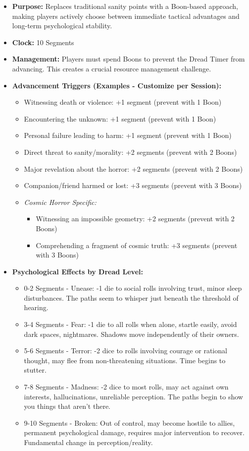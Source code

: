 \documentclass[11pt]{article}
\begin{document}
\begin{itemize}
\item \textbf{Purpose:} Replaces traditional sanity points with a Boon-based approach, making players actively choose between immediate tactical advantages and long-term psychological stability.
\item \textbf{Clock:} 10 Segments
\item \textbf{Management:} Players must spend Boons to prevent the Dread Timer from advancing. This creates a crucial resource management challenge.
\item \textbf{Advancement Triggers (Examples - Customize per Session):}
\begin{itemize}
\item Witnessing death or violence: +1 segment (prevent with 1 Boon)
\item Encountering the unknown: +1 segment (prevent with 1 Boon)
\item Personal failure leading to harm: +1 segment (prevent with 1 Boon)
\item Direct threat to sanity/morality: +2 segments (prevent with 2 Boons)
\item Major revelation about the horror: +2 segments (prevent with 2 Boons)
\item Companion/friend harmed or lost: +3 segments (prevent with 3 Boons)
\item \textit{Cosmic Horror Specific:}
\begin{itemize}
\item Witnessing an impossible geometry: +2 segments (prevent with 2 Boons)
\item Comprehending a fragment of cosmic truth: +3 segments (prevent with 3 Boons)
\end{itemize}
\end{itemize}
\item \textbf{Psychological Effects by Dread Level:}
\begin{itemize}
\item 0-2 Segments - Unease: -1 die to social rolls involving trust, minor sleep disturbances. The paths seem to whisper just beneath the threshold of hearing.
\item 3-4 Segments - Fear: -1 die to all rolls when alone, startle easily, avoid dark spaces, nightmares. Shadows move independently of their owners.
\item 5-6 Segments - Terror: -2 dice to rolls involving courage or rational thought, may flee from non-threatening situations. Time begins to stutter.
\item 7-8 Segments - Madness: -2 dice to most rolls, may act against own interests, hallucinations, unreliable perception. The paths begin to show you things that aren't there.
\item 9-10 Segments - Broken: Out of control, may become hostile to allies, permanent psychological damage, requires major intervention to recover. Fundamental change in perception/reality.
\end{itemize}
\end{itemize}
\end{document}
